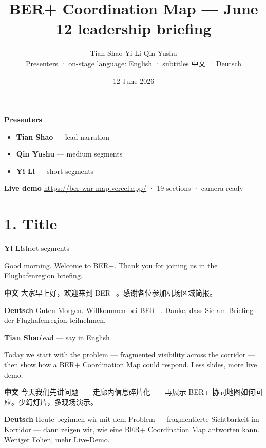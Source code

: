 \documentclass[11pt,a4paper]{ctexart}
\title{\textbf{BER+ Coordination Map — June 12 leadership briefing}}
\author{%
  Tian Shao \quad Yi Li \quad Qin Yushu\\[0.4em]
  \small Presenters · on-stage language: English · subtitles 中文 · Deutsch
}
\date{12 June 2026}
\newenvironment{speakerblock}[2]{%
  \par\medskip
  {\color{berblue}\textbf{#1}}\hfill{\small\textcolor{bergrey}{#2}}\par
  \vspace{0.25em}
}{\par\medskip}
\begin{document}
\maketitle
\thispagestyle{fancy}

\vspace{-0.5em}
\noindent\textbf{Presenters}
\begin{itemize}[leftmargin=1.4em,itemsep=0.15em]
  \item \textbf{Tian Shao} — lead narration
  \item \textbf{Qin Yushu} — medium segments
  \item \textbf{Yi Li} — short segments
\end{itemize}

\vspace{0.4em}
\noindent\textbf{Live demo} \url{https://ber-war-map.vercel.app/} · 19 sections · camera-ready

\tableofcontents
\newpage


\section{1. Title}

\begin{speakerblock}{Yi Li}{short segments}
\begin{englishbox}
Good morning. Welcome to BER+. Thank you for joining us in the Flughafenregion briefing.
\end{englishbox}

\textbf{中文} 大家早上好，欢迎来到 BER+。感谢各位参加机场区域简报。

\textbf{Deutsch} Guten Morgen. Willkommen bei BER+. Danke, dass Sie am Briefing der Flughafenregion teilnehmen.
\end{speakerblock}


\begin{speakerblock}{Tian Shao}{lead — say in English}
\begin{englishbox}
Today we start with the problem — fragmented visibility across the corridor — then show how a BER+ Coordination Map could respond. Less slides, more live demo.
\end{englishbox}

\textbf{中文} 今天我们先讲问题——走廊内信息碎片化——再展示 BER+ 协同地图如何回应。少幻灯片，多现场演示。

\textbf{Deutsch} Heute beginnen wir mit dem Problem — fragmentierte Sichtbarkeit im Korridor — dann zeigen wir, wie eine BER+ Coordination Map antworten kann. Weniger Folien, mehr Live-Demo.
\end{speakerblock}
\end{document}
